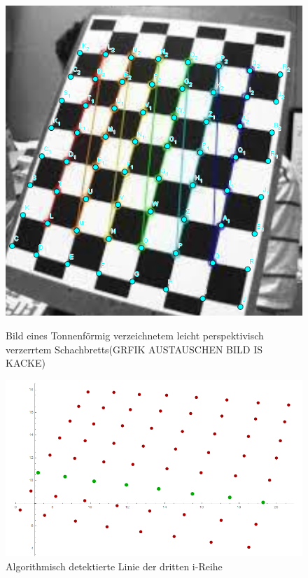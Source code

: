 \begin{figure}[!htb]
	\includegraphics[width=\linewidth]{images/TonnePers.png}
	\caption{Bild eines Tonnenförmig verzeichnetem leicht perspektivisch verzerrtem Schachbretts(GRFIK AUSTAUSCHEN BILD IS KACKE)}
	\label{fig:awesome_image1}
	\endminipage\hfill
	\includegraphics[width=\linewidth]{images/AlgTonnePers.png}
	\caption{Algorithmisch detektierte Linie der dritten i-Reihe}
	\label{fig:awesome_image2}
	\endminipage\hfill
\end{figure}


